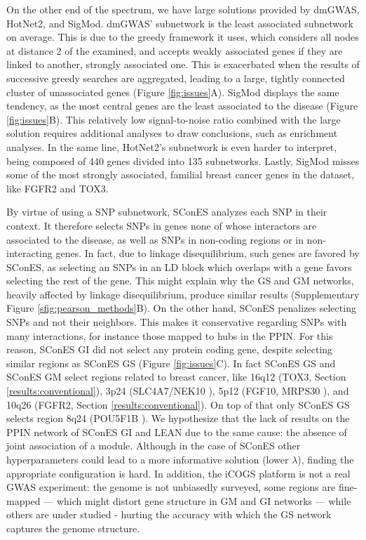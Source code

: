 \documentclass[twocolumn, 10pt]{article}
\begin{document}
On the other end of the spectrum, we have large solutions provided by dmGWAS, HotNet2, and SigMod. dmGWAS' subnetwork is the least associated subnetwork on average. This is due to the greedy framework it uses, which considers all nodes at distance 2 of the examined, and accepts weakly associated genes if they are linked to another, strongly associated one. This is exacerbated when the results of successive greedy searches are aggregated, leading to a large, tightly connected cluster of unassociated genes (Figure \ref{fig:issues}A). SigMod displays the same tendency, as the most central genes are the least associated to the disease (Figure \ref{fig:issues}B). This relatively low signal-to-noise ratio combined with the large solution requires additional analyses to draw conclusions, such as enrichment analyses. In the same line, HotNet2's subnetwork is even harder to interpret, being composed of 440 genes divided into 135 subnetworks. Lastly, SigMod misses some of the most strongly associated, familial breast cancer genes in the dataset, like FGFR2 and TOX3.

By virtue of using a SNP subnetwork, SConES analyzes each SNP in their context. It therefore selects SNPs in genes none of whose interactors are associated to the disease, as well as SNPs in non-coding regions or in non-interacting genes. In fact, due to linkage disequilibrium, such genes are favored by SConES, as selecting an SNPs in an LD block which overlaps with a gene favors selecting the rest of the gene. This might explain why the GS and GM networks, heavily affected by linkage disequilibrium, produce similar results (Supplementary Figure \ref{sfig:pearson_methods}B). On the other hand, SConES penalizes selecting SNPs and not their neighbors. This makes it conservative regarding SNPs with many interactions, for instance those mapped to hubs in the PPIN. For this reason, SConES GI did not select any protein coding gene, despite selecting similar regions as SConES GS (Figure \ref{fig:issues}C). In fact SConES GS and SConES GM select regions related to breast cancer, like 16q12 (TOX3, Section \ref{results:conventional}), 3p24 (SLC4A7/NEK10 \cite{ahmed_newly_2009}), 5p12 (FGF10, MRPS30 \cite{quigley_5p12_2014}), and 10q26 (FGFR2, Section \ref{results:conventional}). On top of that only SConES GS selects region 8q24 (POU5F1B \cite{breyer_expressed_2014}). We hypothesize that the lack of results on the PPIN network of SConES GI and LEAN due to the same cause: the absence of joint association of a module. Although in the case of SConES other hyperparameters could lead to a more informative solution (lower \(\lambda\)), finding the appropriate configuration is hard. In addition, the iCOGS platform is not a real GWAS experiment: the genome is not unbiasedly surveyed, some regions are fine-mapped --- which might distort gene structure in GM and GI networks --- while others are under studied - hurting the accuracy with which the GS network captures the genome structure. 
\end{document}
